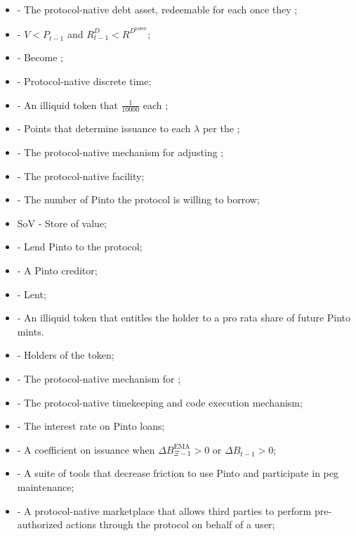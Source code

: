 \documentclass[class=article, crop=false]{standalone}
\begin{document}
\begin{itemize}[topsep=0pt, itemsep=3pt,leftmargin=16pt]
    \item[]  - The protocol-native debt asset, redeemable for  each once they ;
    \item[]  - $V < P_{\overline{t-1}}$ and $R_{t-1}^{D} < R^{D^{\text{lower}}}$;
    \item[]  - Become ;
    \item[]  - Protocol-native discrete time;
    \item[]  - An illiquid token that  $\frac{1}{10000}$  each ;
    \item[]  - Points that determine  issuance to each $\lambda$ per the ;
    \item[]  - The protocol-native mechanism for adjusting ;
    \item[]  - The protocol-native  facility;
    \item[]  - The number of Pinto the protocol is willing to borrow;
    \item[] SoV - Store of value;
    \item[]  - Lend Pinto to the protocol;
    \item[]  - A Pinto creditor;
    \item[]  - Lent;
    \item[]  - An illiquid token that entitles the holder to a pro rata share of future Pinto mints.
    \item[]  - Holders of the  token;
    \item[]  - The protocol-native mechanism for ;
    \item[]  - The protocol-native timekeeping and code execution mechanism;
    \item[]  - The interest rate on Pinto loans;
    \item[]  - A coefficient on  issuance when $\Delta B_{\Xi-1}^{\text{EMA}} > 0$ or $\Delta B_{\overline{t-1}} > 0$;
    \item[]  - A suite of tools that decrease friction to use Pinto and participate in peg maintenance;
    \item[]  - A protocol-native marketplace that allows third parties to perform pre-authorized actions through the protocol on behalf of a user;

\end{itemize}
\end{document}
